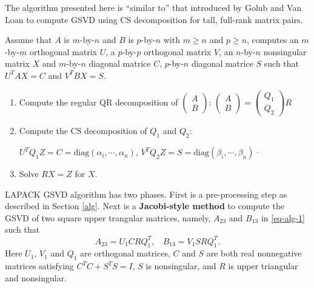 \begin{remark}
{\rm The algorithm presented here is ``similar to'' that introduced by 
Golub and Van Loan \cite[pp.~502--503]{golub2013matrix} 
to compute GSVD using CS decomposition for tall, full-rank matrix pairs.

Assume that $A$ is $m$-by-$n$ and $B$ is $p$-by-$n$ with $m \geq n$ and $p \geq n$, computes an $m$-by-$m$ orthogonal matrix $U$, a $p$-by-$p$ orthogonal matrix $V$, an $n$-by-$n$ nonsingular matrix $X$ and $m$-by-$n$ diagonal matrice $C$, $p$-by-$n$ diagonal matrice $S$ such that $U^{T}AX = C$ and $V^{T}BX = S$.
\begin{enumerate}
\item Compute the regular QR decomposition of $\begin{pmatrix} A\\ B\end{pmatrix}$:
        $\begin{pmatrix}
        A \\
        B
       \end{pmatrix}  = \begin{pmatrix}
        Q_1 \\
        Q_2
       \end{pmatrix}R$

       \item Compute the CS decomposition of $Q_1$ and $Q_2$:

        $U^{T}Q_1Z = C = \mbox{diag}(\alpha_i, \cdots, \alpha_n)$,
        $V^{T}Q_2Z = S = \mbox{diag}(\beta_i, \cdots, \beta_n)$·

        \item Solve $RX = Z$ for $X$.
    \end{enumerate}
}\end{remark} 

\begin{remark} 
{\rm 
LAPACK GSVD  algorithm \cite[pp.~51--53]{anderson1999lapack} has two phases.  First is a pre-processing step as described in Section \ref{alg}. 
Next is a {\bf Jacobi-style method} 
\cite{paige1986computing,bai1993computing} to compute the GSVD 
of two square upper trangular matrices, namely, 
$A_{23}$ and $B_{13}$ in \eqref{eq-alg-1} such that
\begin{equation} \label{eq-alg-jacobi}
A_{23} = U_1CRQ_1^{T},\ \ \ \ B_{13} = V_1SRQ_1^{T}.
\end{equation}
Here $U_1$, $V_1$ and $Q_1$ are orthogonal matrices, $C$ and $S$ are 
both real nonnegative matrices satisfying $C^TC + S^TS = I$, 
$S$ is nonsingular, and $R$ is upper triangular and nonsingular.
} \end{remark} 


